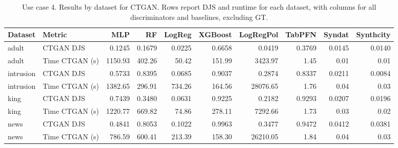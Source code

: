 \begin{table}[ht]
\centering
\small
\setlength{\tabcolsep}{3pt}
\caption{Use case 4. Results by dataset for CTGAN. Rows report DJS and runtime for each dataset, with columns for all discriminators and baselines, excluding GT.}
\label{tab:uc4_ctgan_by_classifier}
\begin{tabular}{llrrrrrrrr}
\toprule
Dataset & Metric & MLP & RF & LogReg & XGBoost & LogRegPol & TabPFN & Syndat & Synthcity \\
\midrule
adult & CTGAN DJS & 0.1245 & 0.1679 & 0.0225 & 0.6658 & 0.0419 & 0.3769 & 0.0145 & 0.0140 \\
adult & Time CTGAN (s) & 1150.93 & 402.26 & 50.42 & 151.99 & 3423.97 & 1.45 & 0.01 & 0.01 \\
intrusion & CTGAN DJS & 0.5733 & 0.8395 & 0.0685 & 0.9037 & 0.2874 & 0.8337 & 0.0211 & 0.0084 \\
intrusion & Time CTGAN (s) & 1382.65 & 296.91 & 734.26 & 164.56 & 28076.65 & 1.76 & 0.04 & 0.03 \\
king & CTGAN DJS & 0.7439 & 0.3480 & 0.0631 & 0.9225 & 0.2182 & 0.9293 & 0.0207 & 0.0196 \\
king & Time CTGAN (s) & 1220.77 & 669.82 & 74.86 & 278.11 & 7292.66 & 1.73 & 0.03 & 0.02 \\
news & CTGAN DJS & 0.4841 & 0.8053 & 0.1022 & 0.9963 & 0.3477 & 0.9472 & 0.0412 & 0.0381 \\
news & Time CTGAN (s) & 786.59 & 600.41 & 213.39 & 158.30 & 26210.05 & 1.84 & 0.04 & 0.03 \\
\bottomrule
\end{tabular}
\end{table}